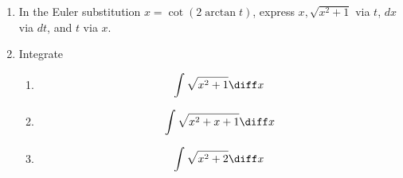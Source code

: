\begin{enumerate}
\item In the Euler substitution $x=\cot (2\arctan t)$, express  $x,\sqrt{x^2+1} $ via $t$, $dx$ via $dt$, and $t$ via $x$.
\item Integrate
\begin{enumerate}
\item 
\[
\int \sqrt{x^2+1}\diff x
\]
\item 
\[
\int \sqrt{x^2+x+1}\diff x
\]
\item 
\[
\int \sqrt{x^2+2}\diff x
\]
\end{enumerate}
\end{enumerate}
